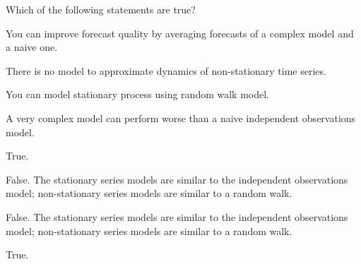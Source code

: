 
\begin{question}
Which of the following statements are true?
\begin{answerlist}
  \item You can improve forecast quality by averaging forecasts of a complex model and a naive one.
  \item There is no model to approximate dynamics of non-stationary time series.
  \item You can model stationary process using random walk model.
  \item A very complex model can perform worse than a naive independent observations model.
\end{answerlist}
\end{question}

\begin{solution}
\begin{answerlist}
  \item True.
  \item False. The stationary series models are similar to the independent observations model; non-stationary series models are similar to a random walk.
  \item False. The stationary series models are similar to the independent observations model; non-stationary series models are similar to a random walk.
  \item True.
\end{answerlist}
\end{solution}

